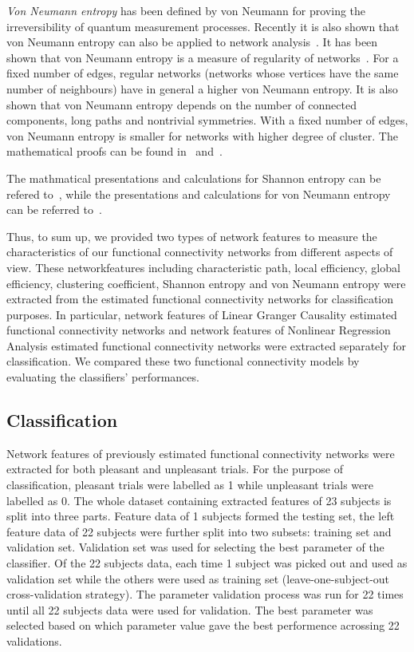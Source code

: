 \emph{Von Neumann entropy} has been defined by von Neumann for proving the irreversibility of quantum measurement processes. Recently it is also shown that von Neumann entropy can also be applied to network analysis~\cite{passerini2008neumann}. It has been shown that von Neumann entropy is a measure of regularity of networks~\cite{passerini2008neumann}. For a fixed number of edges, regular networks (networks whose vertices have the same number of neighbours) have in general a higher von Neumann entropy. It is also shown that von Neumann entropy depends on the number of connected components, long paths and nontrivial symmetries. With a fixed number of edges, von Neumann entropy is smaller for networks with higher degree of cluster. The mathematical proofs can be found in~\cite{passerini2008neumann} and~\cite{anand2009entropy}.

The mathmatical presentations and calculations for Shannon entropy can be refered to~\cite{lin1991divergence}, while the presentations and calculations for von Neumann entropy can be referred to~\cite{passerini2008neumann}.

Thus, to sum up, we provided two types of network features to measure the characteristics of our functional connectivity networks from different aspects of view. These networkfeatures including characteristic path, local efficiency, global efficiency, clustering coefficient, Shannon entropy and von Neumann entropy were extracted from the estimated functional connectivity networks for classification purposes. In particular, network features of Linear Granger Causality estimated functional connectivity networks and network features of Nonlinear Regression Analysis estimated functional connectivity networks were extracted separately for classification. We compared these two functional connectivity models by evaluating the classifiers' performances. 

\subsection{Classification}
Network features of previously estimated functional connectivity networks were extracted for both pleasant and unpleasant trials. For the purpose of classification, pleasant trials were labelled as 1 while unpleasant trials were labelled as 0. The whole dataset containing extracted features of 23 subjects is split into three parts. Feature data of 1 subjects formed the testing set, the left feature data of 22 subjects were further split into two subsets: training set and validation set. Validation set was used for selecting the best parameter of the classifier. Of the 22 subjects data, each time 1 subject was picked out and used as validation set while the others were used as training set (leave-one-subject-out cross-validation strategy). The parameter validation process was run for 22 times until all 22 subjects data were used for validation. The best parameter was selected based on which parameter value gave the best performence acrossing 22 validations.    

